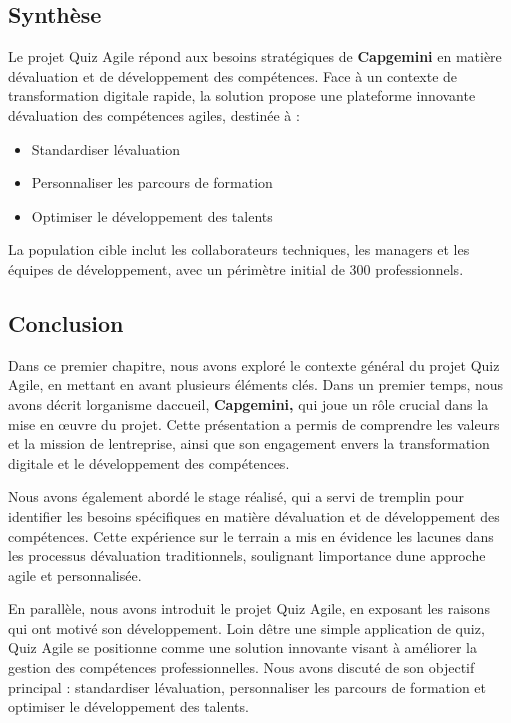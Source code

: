 \documentclass[12pt,a4paper,twoside]{report}
\begin{document}
\hypertarget{synthuxe8se}{%
\subsection{Synthèse}\label{synthuxe8se}}

Le projet Quiz Agile répond aux besoins stratégiques de
\textbf{Capgemini} en matière d\textquotesingle évaluation et de
développement des compétences. Face à un contexte de transformation
digitale rapide, la solution propose une plateforme innovante
d\textquotesingle évaluation des compétences agiles, destinée à :

\begin{itemize}
\item
  Standardiser l\textquotesingle évaluation
\item
  Personnaliser les parcours de formation
\item
  Optimiser le développement des talents
\end{itemize}

La population cible inclut les collaborateurs techniques, les managers
et les équipes de développement, avec un périmètre initial de 300
professionnels.

\hypertarget{conclusion}{%
\subsection{Conclusion}\label{conclusion}}

Dans ce premier chapitre, nous avons exploré le contexte général du
projet Quiz Agile, en mettant en avant plusieurs éléments clés. Dans un
premier temps, nous avons décrit l\textquotesingle organisme
d\textquotesingle accueil, \textbf{Capgemini,} qui joue un rôle crucial
dans la mise en œuvre du projet. Cette présentation a permis de
comprendre les valeurs et la mission de l\textquotesingle entreprise,
ainsi que son engagement envers la transformation digitale et le
développement des compétences.

Nous avons également abordé le stage réalisé, qui a servi de tremplin
pour identifier les besoins spécifiques en matière
d\textquotesingle évaluation et de développement des compétences. Cette
expérience sur le terrain a mis en évidence les lacunes dans les
processus d\textquotesingle évaluation traditionnels, soulignant
l\textquotesingle importance d\textquotesingle une approche agile et
personnalisée.

En parallèle, nous avons introduit le projet Quiz Agile, en exposant les
raisons qui ont motivé son développement. Loin d\textquotesingle être
une simple application de quiz, Quiz Agile se positionne comme une
solution innovante visant à améliorer la gestion des compétences
professionnelles. Nous avons discuté de son objectif principal :
standardiser l\textquotesingle évaluation, personnaliser les parcours de
formation et optimiser le développement des talents.
\end{document}
